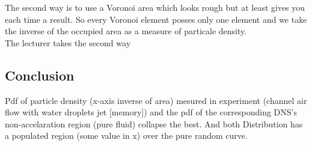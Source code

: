 \documentclass[a4paper,10pt,francais]{article}
\begin{document}
The second way is to use a Voronoi area which looks rough but at least gives you each time a result. So every Voronoi element posses only one element and we take the inverse of the occupied area as a measure of particale density. \\

The lecturer takes the second way\\ 

\subsection{Conclusion}
Pdf of particle density (x-axis inverse of area) mesured in experiment (channel air flow with water droplets jet [memory]) and the pdf of the corresponding DNS's non-accelaration region (pure fluid) collapse the best. And both Distribution has a populated region (some value in x) over the pure random curve.\\
\end{document}
